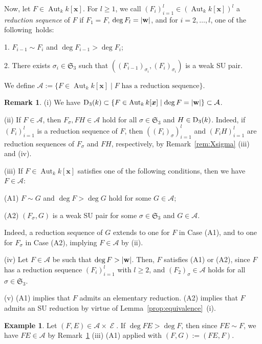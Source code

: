 \documentclass{amsart}
\theoremstyle{plain}
\theoremstyle{definition}
\newtheorem{example}[thm]{Example}
\newtheorem{rem}[thm]{Remark}
\newcommand{\A}{\mathcal{A}}
\newcommand{\E }{{\mathop{\mathcal{E}}\nolimits}}
\renewcommand{\rightsquigarrow }{\mathbin{\sim}}
\newcommand{\Aut }{\mathop{\mathrm{Aut}}\nolimits}
\newcommand{\nd}{\noindent}
\newcommand{\x}{{\boldsymbol x}}
\newcommand{\w}{{\bf w}}
\newcommand{\kx}{k[\x]}
\newcommand{\sym}{\mathfrak{S}}
\begin{document}
Now, let $F\in \Aut _k\kx $. 
For $l\ge 1$, 
we call $(F_i)_{i=1}^l\in (\Aut _k\kx )^l$ 
a {\it reduction sequence} of $F$ 
if $F_1=F$, $\deg F_l=|\w |$, 
and for $i=2,\ldots ,l$, 
one of the following~holds: 


1. $F_{i-1}\rightsquigarrow F_i$ and $\deg F_{i-1}>\deg F_i$; 


2. There exists $\sigma _i\in \sym _3$ such that 
$((F_{i-1})_{\sigma _i},(F_i)_{\sigma _i})$ is a weak SU pair. 



\nd 
We define 
$\mathcal{A}:=\{ F\in \Aut _k\kx \mid 
\text{$F$ has a reduction sequence}\} . $ 


\begin{rem}\label{rem:A}\rm 
\nd (i) 
We have 
${\rm D}_3(k)\subset \{ F\in \Aut _k\kx \mid \deg F=|\w |\} 
\subset \mathcal{A}$. 



\nd (ii) 
If $F\in \mathcal{A}$, 
then $F_\sigma ,FH\in \mathcal{A}$ hold for all 
$\sigma \in \sym _3$ and $H\in {\rm D}_3(k)$. 
Indeed, 
if $(F_i)_{i=1}^l$ is a reduction sequence of $F$, 
then 
$((F_i)_\sigma )_{i=1}^l$ and 
$(F_iH)_{i=1}^l$ are reduction sequences of $F_\sigma $ and $FH$, 
respectively, 
by Remark~\ref{rem:Xsigma} (iii) and (iv). 




\nd (iii) 
If $F\in \Aut _k\kx $ satisfies 
one of the following conditions, 
then we have $F\in \A $: 


(A1) 
$F\sim G$ and $\deg F>\deg G$ hold for some $G\in \A $; 


(A2) 
$(F_{\sigma },G)$ is a weak SU pair 
for some $\sigma \in \sym _3$ and $G\in \A $. 


\nd 
Indeed, 
a reduction sequence of $G$ 
extends to one for $F$ in Case (A1), 
and to one for $F_\sigma $ in Case (A2), 
implying $F\in \A $ by (ii). 


\nd (iv) 
Let $F\in \A $ be such that $\deg F>|\w |$. 
Then, $F$ satisfies (A1) or (A2), 
since $F$ has a reduction sequence 
$(F_i)_{i=1}^l$ with $l\ge 2$, 
and $(F_2)_\sigma \in \A $ holds for all $\sigma \in \sym _3$. 


\nd (v) 
(A1) implies that $F$ admits an elementary reduction. 
(A2) implies that $F$ admits an SU reduction 
by virtue of Lemma~\ref{prop:equivalence}~(i). 
\end{rem}



\begin{example}\label{exc:AAA}\rm 
Let $(F,E)\in \A \times \E $. 
If $\deg FE>\deg F$, 
then since $FE\rightsquigarrow F$, 
we have $FE\in \A $ by Remark~\ref{rem:A} (iii) (A1) 
applied with $(F,G):=(FE,F)$. 
\end{example}
\end{document}
